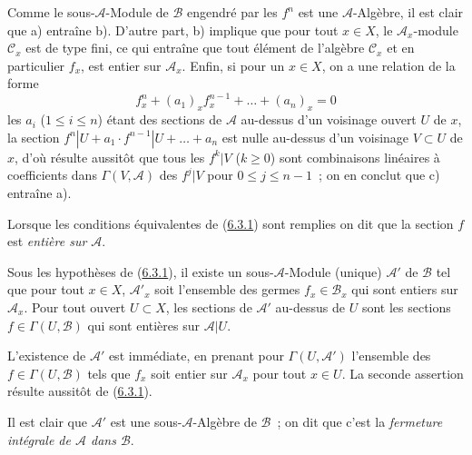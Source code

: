 
Comme le sous-$\mathcal{A}$-Module de $\mathcal{B}$ engendré par les $f^n$ est
une $\mathcal{A}$-Algèbre, il est clair que a) entraîne b). D'autre part, b)
implique que pour tout $x\in X$, le $\mathcal{A}_x$-module $\mathcal{C}_x$ est
de type fini, ce qui entraîne que tout élément de l'algèbre $\mathcal{C}_x$ et
en particulier $f_x$, est entier sur $\mathcal{A}_x$. Enfin, si pour un
$x\in X$, on a une relation de la forme
\[
f_x^n+(a_1)_xf_x^{n-1}+\ldots+(a_n)_x=0
\]
les $a_i$ ($1\leq i\leq n$) étant des sections de $\mathcal{A}$ au-dessus
d'un voisinage ouvert $U$ de $x$, la section
$f^n|U+a_1\cdot f^{n-1}|U+\ldots+a_n$ est nulle au-dessus d'un voisinage
$V\subset U$ de $x$, d'où résulte aussitôt que tous les $f^k|V$ ($k\geq0$)
sont combinaisons linéaires à coefficients dans $\Gamma(V,\mathcal{A})$ des
$f^j|V$ pour $0\leq j\leq n-1$~; on en conclut que c) entraîne a).

Lorsque les conditions équivalentes de (\hyperref[II.6.3.1-fr]{6.3.1}) sont
remplies on dit que la section $f$ est \emph{entière sur $\mathcal{A}$}.

\begin{corollary}[6.3.2]
\label{II.6.3.2-fr}
Sous les hypothèses de (\hyperref[II.6.3.1-fr]{6.3.1}), il existe un
sous-$\mathcal{A}$-Module (unique) $\mathcal{A}'$ de $\mathcal{B}$ tel que pour
tout $x\in X$, $\mathcal{A}'_x$ soit l'ensemble des germes
$f_x\in\mathcal{B}_x$ qui sont entiers sur $\mathcal{A}_x$. Pour tout ouvert
$U\subset X$, les sections de $\mathcal{A}'$ au-dessus de $U$ sont les
sections $f\in\Gamma(U,\mathcal{B})$ qui sont entières sur
$\mathcal{A}|U$.
\end{corollary}

L'existence de $\mathcal{A}'$ est immédiate, en prenant pour
$\Gamma(U,\mathcal{A}')$ l'ensemble des $f\in\Gamma(U,\mathcal{B})$ tels que
$f_x$ soit entier sur $\mathcal{A}_x$ pour tout $x\in U$. La seconde
assertion résulte aussitôt de (\hyperref[II.6.3.1-fr]{6.3.1}).

Il est clair que $\mathcal{A}'$ est une sous-$\mathcal{A}$-Algèbre de
$\mathcal{B}$~; on dit que c'est la \emph{fermeture intégrale de
$\mathcal{A}$ dans $\mathcal{B}$}.

